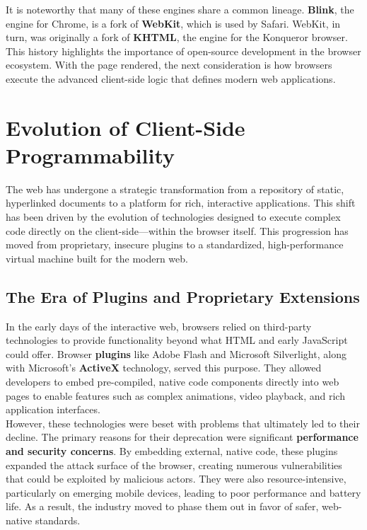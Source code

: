 \documentclass{scrbook}
\begin{document}
It is noteworthy that many of these engines share a common lineage. \textbf{Blink}, the engine for Chrome, is a fork of \textbf{WebKit}, which is used by Safari. WebKit, in turn, was originally a fork of \textbf{KHTML}, the engine for the Konqueror browser. This history highlights the importance of open-source development in the browser ecosystem. With the page rendered, the next consideration is how browsers execute the advanced client-side logic that defines modern web applications.

\chapter{Evolution of Client-Side Programmability}

The web has undergone a strategic transformation from a repository of static, hyperlinked documents to a platform for rich, interactive applications. This shift has been driven by the evolution of technologies designed to execute complex code directly on the client-side—within the browser itself. This progression has moved from proprietary, insecure plugins to a standardized, high-performance virtual machine built for the modern web.

\section{The Era of Plugins and Proprietary Extensions}

In the early days of the interactive web, browsers relied on third-party technologies to provide functionality beyond what HTML and early JavaScript could offer. Browser \textbf{plugins} like Adobe Flash and Microsoft Silverlight, along with Microsoft's \textbf{ActiveX} technology, served this purpose. They allowed developers to embed pre-compiled, native code components directly into web pages to enable features such as complex animations, video playback, and rich application interfaces. \\

However, these technologies were beset with problems that ultimately led to their decline. The primary reasons for their deprecation were significant \textbf{performance and security concerns}. By embedding external, native code, these plugins expanded the attack surface of the browser, creating numerous vulnerabilities that could be exploited by malicious actors. They were also resource-intensive, particularly on emerging mobile devices, leading to poor performance and battery life. As a result, the industry moved to phase them out in favor of safer, web-native standards.
\end{document}
